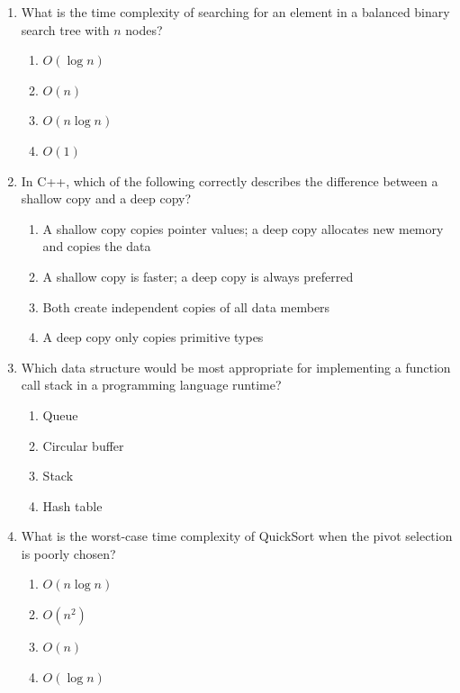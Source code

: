 \documentclass[11pt]{article}
\begin{document}
\begin{enumerate}[label=\textbf{\arabic*.}]

  \item What is the time complexity of searching for an element in a balanced binary search tree 
  with $n$ nodes?
  \begin{enumerate}[label=(\Alph*)]
    \item $O(\log n)$
    \item $O(n)$
    \item $O(n \log n)$
    \item $O(1)$
  \end{enumerate}

  \item In C++, which of the following correctly describes the difference between a shallow copy 
  and a deep copy?
  \begin{enumerate}[label=(\Alph*)]
    \item A shallow copy copies pointer values; a deep copy allocates new memory and copies the data
    \item A shallow copy is faster; a deep copy is always preferred
    \item Both create independent copies of all data members
    \item A deep copy only copies primitive types
  \end{enumerate}

  \item Which data structure would be most appropriate for implementing a function call stack in a 
  programming language runtime?
  \begin{enumerate}[label=(\Alph*)]
    \item Queue
    \item Circular buffer
    \item Stack
    \item Hash table
  \end{enumerate}

  \item What is the worst-case time complexity of QuickSort when the pivot selection is poorly chosen?
  \begin{enumerate}[label=(\Alph*)]
    \item $O(n \log n)$
    \item $O(n^2)$
    \item $O(n)$
    \item $O(\log n)$
  \end{enumerate}


\end{enumerate}
\end{document}
